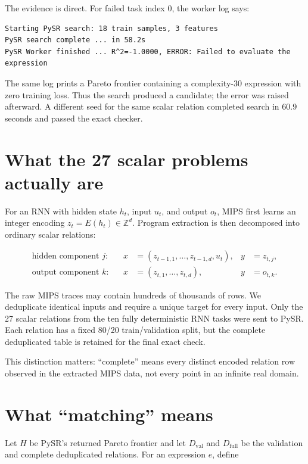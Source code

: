 \documentclass[10pt]{article}
\begin{document}
The evidence is direct.  For failed task index 0, the worker log says:

\begin{lstlisting}
Starting PySR search: 18 train samples, 3 features
PySR search complete ... in 58.2s
PySR Worker finished ... R^2=-1.0000, ERROR: Failed to evaluate the expression
\end{lstlisting}

The same log prints a Pareto frontier containing a complexity-30 expression
with zero training loss.  Thus the search produced a candidate; the error was
raised afterward.  A different seed for the same scalar relation completed
search in 60.9 seconds and passed the exact checker.

\section{What the 27 scalar problems actually are}

For an RNN with hidden state $h_t$, input $u_t$, and output $o_t$, MIPS first
learns an integer encoding $z_t=E(h_t)\in\mathbb{Z}^d$.  Program extraction is
then decomposed into ordinary scalar relations:

\begin{align}
\text{hidden component }j:&&
  x &= (z_{t-1,1},\ldots,z_{t-1,d},u_t), & y&=z_{t,j},\\
\text{output component }k:&&
  x &= (z_{t,1},\ldots,z_{t,d}), & y&=o_{t,k}.
\end{align}

The raw MIPS traces may contain hundreds of thousands of rows.  We deduplicate
identical inputs and require a unique target for every input.  Only the 27
scalar relations from the ten fully deterministic RNN tasks were sent to
PySR.  Each relation has a fixed 80/20 train/validation split, but the complete
deduplicated table is retained for the final exact check.

This distinction matters: ``complete'' means every distinct encoded relation
row observed in the extracted MIPS data, not every point in an infinite real
domain.

\section{What ``matching'' means}

Let $H$ be PySR's returned Pareto frontier and let $D_{\mathrm{val}}$ and
$D_{\mathrm{full}}$ be the validation and complete deduplicated relations.  For
an expression $e$, define
\end{document}
